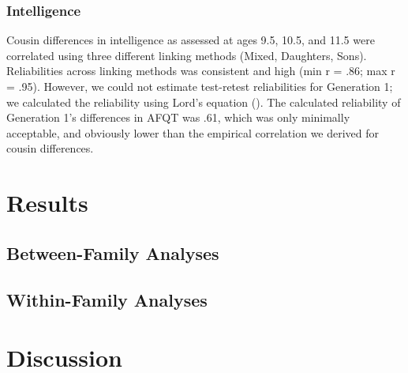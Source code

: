 \documentclass[a4paper,man,apacite,natbib,12pt,longtable]{apa6}\usepackage[]{graphicx}\usepackage[]{color}
\begin{document}
\subsubsection{Intelligence} Cousin differences in intelligence as assessed at ages 9.5, 10.5, and 11.5 were correlated using three different linking methods (Mixed, Daughters, Sons). Reliabilities across linking methods was consistent and high (min r = .86; max r = .95). However, we could not estimate test-retest reliabilities for Generation 1; we calculated the reliability using Lord's equation (\citeyear{Lord1963}). The calculated reliability of Generation 1's differences in AFQT was .61, which was only minimally  acceptable, and obviously lower than the empirical correlation we derived for cousin differences.%

\section{Results}

%
\subsection{Between-Family Analyses}

%
\subsection{Within-Family Analyses}

%
\section{Discussion}

\end{document}
